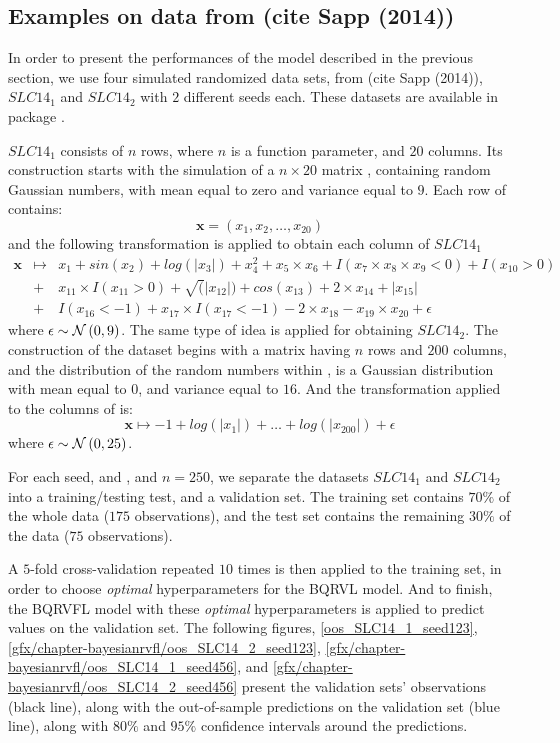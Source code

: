 \newpage

\subsection{Examples on data from (cite Sapp (2014))}
\label{sec:sapp2014}

In order to present the performances of the model described in the previous section, we use four simulated randomized data sets, from (cite Sapp (2014)), $SLC14_1$ and $SLC14_2$ with $2$ different seeds each. These datasets are available in  package . 

$SLC14_1$ consists of $n$ rows, where $n$ is a function parameter, and $20$ columns. Its construction starts with the simulation of a $n \times 20$ matrix , containing random Gaussian numbers, with mean equal to zero and variance equal to $9$. Each row of  contains: 
$$
\textbf{x} = \left( x_1, x_2, \ldots, x_{20}\right) 
$$
and the following transformation is applied to obtain each column of $SLC14_1$
\begin{eqnarray*}
 \textbf{x} &\mapsto& x_1 + sin(x_2) + log(|x_3|) + x_4^2 + x_5 \times x_6 +
I(x_7 \times x_8 \times x_9 < 0) + I(x_{10} > 0) \\
&+& x_{11} \times I(x_{11} > 0) + \sqrt(|x_{12}|) +
cos(x_{13}) + 2 \times x_{14} + |x_{15}| \\ 
&+& I(x_{16} < -1) + x_{17} \times I(x_{17} < -1) - 2  \times  x_{18}
- x_{19} \times x_{20} + \epsilon
\end{eqnarray*}
where $\epsilon \sim \mathcal{N}\left(0, 9\right)$. The same type of idea is applied for obtaining $SLC14_2$. The construction of the dataset begins with a matrix  having $n$ rows and $200$ columns, and the distribution of the random numbers within , is a Gaussian distribution with mean equal to $0$, and variance equal to $16$. And the transformation applied to the columns of  is: 
$$
\textbf{x} \mapsto -1 + log(|x_1|) + \ldots + log(|x_{200}|)  + \epsilon
$$
where $\epsilon \sim \mathcal{N}\left(0, 25\right)$.

For each seed,  and , and $n = 250$, we separate the datasets $SLC14_1$ and $SLC14_2$ into a training/testing test, and a validation set. The training set contains $70\%$ of the whole data ($175$ observations), and the test set contains the remaining $30\%$ of the data ($75$ observations). 

A $5$-fold cross-validation repeated $10$ times is then applied to the training set, in order to choose \textit{optimal} hyperparameters for the BQRVL model. And to finish, the BQRVFL model with these \textit{optimal} hyperparameters is applied to predict values on the validation set. The following figures, \ref{oos_SLC14_1_seed123}, \ref{gfx/chapter-bayesianrvfl/oos_SLC14_2_seed123}, \ref{gfx/chapter-bayesianrvfl/oos_SLC14_1_seed456}, and \ref{gfx/chapter-bayesianrvfl/oos_SLC14_2_seed456} present the validation sets' observations (black line), along with the out-of-sample predictions on the validation set (blue line), along with $80\%$ and $95\%$ confidence intervals around the predictions.


